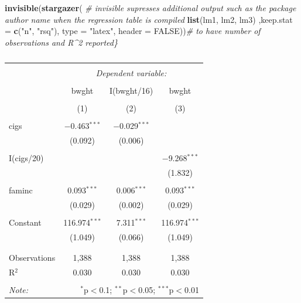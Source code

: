 \documentclass[]{book}
\newenvironment{Shaded}{\begin{snugshade}}{\end{snugshade}}
\newcommand{\CommentTok}[1]{\textcolor[rgb]{0.56,0.35,0.01}{\textit{#1}}}
\newcommand{\DataTypeTok}[1]{\textcolor[rgb]{0.13,0.29,0.53}{#1}}
\newcommand{\KeywordTok}[1]{\textcolor[rgb]{0.13,0.29,0.53}{\textbf{#1}}}
\newcommand{\NormalTok}[1]{#1}
\newcommand{\OtherTok}[1]{\textcolor[rgb]{0.56,0.35,0.01}{#1}}
\newcommand{\StringTok}[1]{\textcolor[rgb]{0.31,0.60,0.02}{#1}}
\begin{document}
\begin{Shaded}
\begin{Highlighting}[]
\KeywordTok{invisible}\NormalTok{(}\KeywordTok{stargazer}\NormalTok{( }\CommentTok{# invisible supresses additional output such as the package author name when the regression table is compiled}
  \KeywordTok{list}\NormalTok{(lm1, }
\NormalTok{       lm2,}
\NormalTok{       lm3)}
\NormalTok{  ,}\DataTypeTok{keep.stat =} \KeywordTok{c}\NormalTok{(}\StringTok{"n"}\NormalTok{, }\StringTok{"rsq"}\NormalTok{), }\DataTypeTok{type =} \StringTok{"latex"}\NormalTok{, }\DataTypeTok{header =} \OtherTok{FALSE}\NormalTok{))}\CommentTok{# to have number of observations and R^2 reported\}}
\end{Highlighting}
\end{Shaded}

\begin{table}[!htbp] \centering 
  \caption{} 
  \label{} 
\begin{tabular}{@{\extracolsep{5pt}}lccc} 
\\[-1.8ex]\hline 
\hline \\[-1.8ex] 
 & \multicolumn{3}{c}{\textit{Dependent variable:}} \\ 
\cline{2-4} 
\\[-1.8ex] & bwght & I(bwght/16) & bwght \\ 
\\[-1.8ex] & (1) & (2) & (3)\\ 
\hline \\[-1.8ex] 
 cigs & $-$0.463$^{***}$ & $-$0.029$^{***}$ &  \\ 
  & (0.092) & (0.006) &  \\ 
  & & & \\ 
 I(cigs/20) &  &  & $-$9.268$^{***}$ \\ 
  &  &  & (1.832) \\ 
  & & & \\ 
 faminc & 0.093$^{***}$ & 0.006$^{***}$ & 0.093$^{***}$ \\ 
  & (0.029) & (0.002) & (0.029) \\ 
  & & & \\ 
 Constant & 116.974$^{***}$ & 7.311$^{***}$ & 116.974$^{***}$ \\ 
  & (1.049) & (0.066) & (1.049) \\ 
  & & & \\ 
\hline \\[-1.8ex] 
Observations & 1,388 & 1,388 & 1,388 \\ 
R$^{2}$ & 0.030 & 0.030 & 0.030 \\ 
\hline 
\hline \\[-1.8ex] 
\textit{Note:}  & \multicolumn{3}{r}{$^{*}$p$<$0.1; $^{**}$p$<$0.05; $^{***}$p$<$0.01} \\ 
\end{tabular} 
\end{table}
\end{document}

